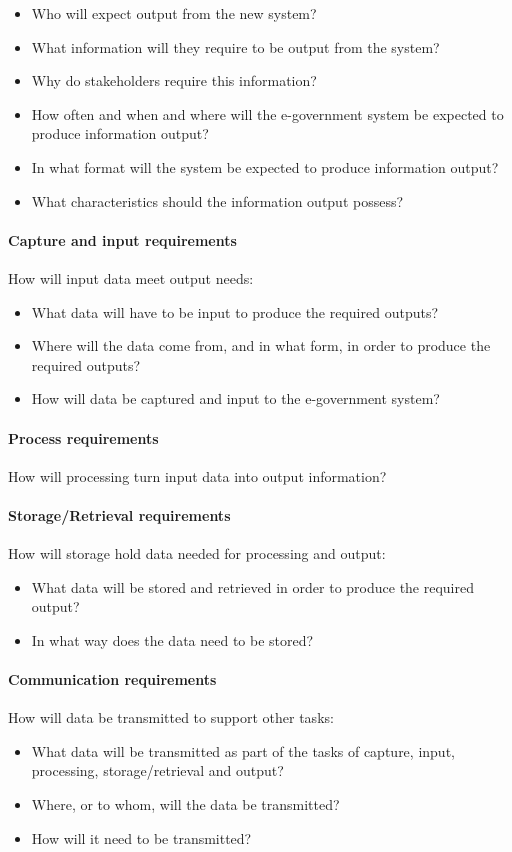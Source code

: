 \begin{itemize}
	\item Who will expect output from the new
	system?
	
	\item What information will they require
	to be output from the system?
	
	\item Why do stakeholders require this information?
	\item How often and when and where will
	the e-government system be expected to
	produce information output?
	\item In what format will the system be
	expected to produce information output?
	\item What characteristics should the information output possess?
\end{itemize}

\paragraph*{Capture and input requirements}
How will input data meet output needs:
\begin{itemize}
	\item What data will have to be input to produce
	the required outputs?
	\item Where will the data come from, and in
	what form, in order to produce the
	required outputs?
	\item How will data be captured and input to
	the e-government system?
\end{itemize}

\paragraph*{Process requirements}
How will processing turn input data into
output information?

\paragraph*{Storage/Retrieval requirements}
How will storage hold data needed for
processing and output:
\begin{itemize}
	\item What data will be stored and retrieved in
	order to produce the required output?
	\item In what way does the data need to be
	stored?
\end{itemize}
\paragraph*{Communication requirements}
How will data be transmitted to support other tasks:
\begin{itemize}

	\item What data will be transmitted as part of
	the tasks of capture, input, processing,
	storage/retrieval and output?
	\item Where, or to whom, will the data be
	transmitted?
	\item How will it need to be transmitted?
\end{itemize}


